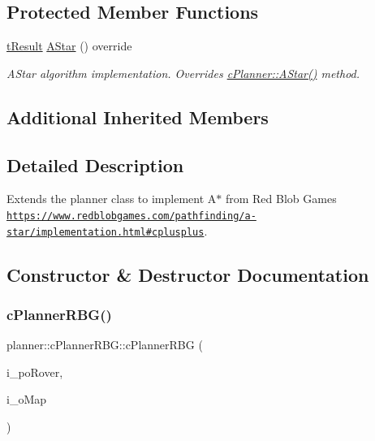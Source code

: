 \subsection*{Protected Member Functions}
\begin{DoxyCompactItemize}
\item 
\mbox{\hyperlink{structt_result}{t\+Result}} \mbox{\hyperlink{classplanner_1_1c_planner_r_b_g_affd7011ef4df878a8e95ecf7f42c8e6f}{A\+Star}} () override
\begin{DoxyCompactList}\small\item\em A\+Star algorithm implementation. Overrides \mbox{\hyperlink{classplanner_1_1c_planner_a341e70531266f023ac9461d18979d1ef}{c\+Planner\+::\+A\+Star()}} method. \end{DoxyCompactList}\end{DoxyCompactItemize}
\subsection*{Additional Inherited Members}


\subsection{Detailed Description}
Extends the planner class to implement A$\ast$ from Red Blob Games \href{https://www.redblobgames.com/pathfinding/a-star/implementation.html#cplusplus}{\tt https\+://www.\+redblobgames.\+com/pathfinding/a-\/star/implementation.\+html\#cplusplus}. 

\subsection{Constructor \& Destructor Documentation}
\mbox{\label{classplanner_1_1c_planner_r_b_g_a91296b98e64effc16f38e2430746d94d}} 
\subsubsection{\texorpdfstring{c\+Planner\+R\+B\+G()}{cPlannerRBG()}}
{\footnotesize\ttfamily planner\+::c\+Planner\+R\+B\+G\+::c\+Planner\+R\+BG (\begin{DoxyParamCaption}\item[{std\+::shared\+\_\+ptr$<$ \mbox{\hyperlink{classplanner_1_1c_rover_interface}{c\+Rover\+Interface}}$<$ 8 $>$$>$}]{i\+\_\+po\+Rover,  }\item[{std\+::shared\+\_\+ptr$<$ \mbox{\hyperlink{classplanner_1_1c_graph}{c\+Graph}} $>$}]{i\+\_\+o\+Map }\end{DoxyParamCaption})}



